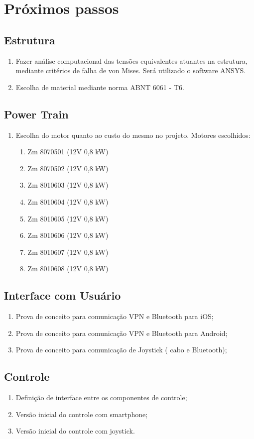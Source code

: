 \section{Próximos passos}
  \subsection{Estrutura}
    \begin{enumerate}
      \item Fazer análise computacional das tensões equivalentes atuantes na estrutura, mediante critérios de falha de von Mises. Será utilizado o software ANSYS.
      \item Escolha de material mediante norma ABNT 6061 - T6.
    \end{enumerate}
  \subsection{Power Train}
    \begin{enumerate}
      \item Escolha do motor quanto ao custo do mesmo no projeto. Motores escolhidos:
      \begin{enumerate}
        \item Zm 8070501 (12V 0,8 kW)
        \item Zm 8070502 (12V 0,8 kW)
        \item Zm 8010603 (12V 0,8 kW)
        \item Zm 8010604 (12V 0,8 kW)
        \item Zm 8010605 (12V 0,8 kW)
        \item Zm 8010606 (12V 0,8 kW)
        \item Zm 8010607 (12V 0,8 kW)
        \item Zm 8010608 (12V 0,8 kW)
      \end{enumerate}
    \end{enumerate}
  \subsection{Interface com Usuário}
    \begin{enumerate}
      \item Prova de conceito para comunicação VPN e Bluetooth para iOS;
      \item Prova de conceito para comunicação VPN e Bluetooth para Android;
      \item Prova de conceito para comunicação de Joystick ( cabo e Bluetooth);
    \end{enumerate}
  \subsection{Controle}
    \begin{enumerate}
     \item Definição de interface entre os componentes de controle;
     \item Versão inicial do controle com smartphone;
     \item Versão inicial do controle com joystick.
    \end{enumerate}
